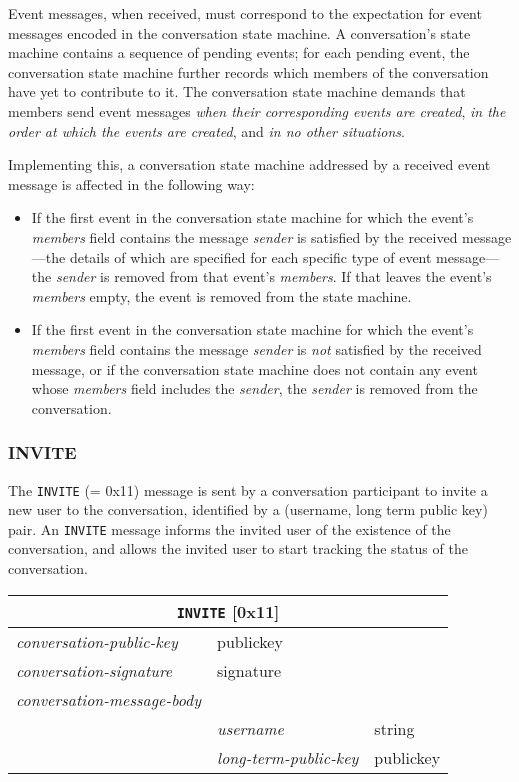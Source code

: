 \documentclass{article}
\def\message#1{\texttt{#1}}
\def\field#1{\textit{#1}}
\def\smfield#1{\textsl{#1}}
\def\type#1{\textsf{#1}}
\newenvironment{conversationmessage}[2]{
\newcommand{\messagefield}[2]{
& \field{##1} & \type{##2} \\
\hline
}
\hspace{2em minus 2em}\begin{tabular}{|l|l|l|}
\hline
\multicolumn{3}{|c|}{\message{#1} [#2]} \\
\hline
\hline
\field{conversation-public-key} & \multicolumn{2}{l|}{\type{publickey}} \\
\hline
\field{conversation-signature} & \multicolumn{2}{l|}{\type{signature}} \\
\hline
\field{conversation-message-body} & \multicolumn{2}{l|}{} \\
\hline
}{
\end{tabular}
}
\begin{document}
Event messages, when received, must correspond to the expectation for event messages encoded in the conversation state machine.
A conversation's state machine contains a sequence of pending events; for each pending event, the conversation state machine further records which members of the conversation have yet to contribute to it.
The conversation state machine demands that members send event messages \emph{when their corresponding events are created}, \emph{in the order at which the events are created}, and \emph{in no other situations}.

Implementing this, a conversation state machine addressed by a received event message is affected in the following way:
\begin{itemize}
\item If the first event in the conversation state machine for which the event's \smfield{members} field contains the message \field{sender} is satisfied by the received message ---the details of which are specified for each specific type of event message--- the \field{sender} is removed from that event's \smfield{members}. If that leaves the event's \smfield{members} empty, the event is removed from the state machine.
\item If the first event in the conversation state machine for which the event's \smfield{members} field contains the message \field{sender} is \emph{not} satisfied by the received message, or if the conversation state machine does not contain any event whose \smfield{members} field includes the \field{sender}, the \field{sender} is removed from the conversation.
\end{itemize}


\subsubsection{INVITE}
\label{sec:messages/invite}

The \message{INVITE} (= 0x11) message is sent by a conversation participant to invite a new user to the conversation, identified by a (username, long term public key) pair.
An \message{INVITE} message informs the invited user of the existence of the conversation, and allows the invited user to start tracking the status of the conversation.

\begin{conversationmessage}{INVITE}{0x11}
\messagefield{username}{string}
\messagefield{long-term-public-key}{publickey}
\end{conversationmessage}
\end{document}
